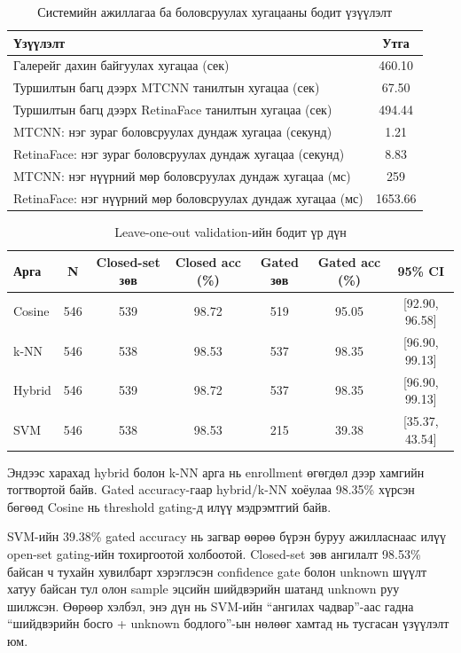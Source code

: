 \begin{table}[H]
	\centering
	\caption{Системийн ажиллагаа ба боловсруулах хугацааны бодит үзүүлэлт}
	\label{tab:attendance-operational-template}
	\begin{tabular}{|l|c|}
		\hline
		\textbf{Үзүүлэлт} & \textbf{Утга} \\
		\hline
		Галерейг дахин байгуулах хугацаа (сек) & 460.10 \\
		\hline
		Туршилтын багц дээрх MTCNN танилтын хугацаа (сек) & 67.50 \\
		\hline
		Туршилтын багц дээрх RetinaFace танилтын хугацаа (сек) & 494.44 \\
		\hline
		MTCNN: нэг зураг боловсруулах дундаж хугацаа (секунд) & 1.21 \\
		\hline
		RetinaFace: нэг зураг боловсруулах дундаж хугацаа (секунд) & 8.83 \\
		\hline
		MTCNN: нэг нүүрний мөр боловсруулах дундаж хугацаа (мс) & 259 \\
		\hline
		RetinaFace: нэг нүүрний мөр боловсруулах дундаж хугацаа (мс) & 1653.66 \\
		\hline
	\end{tabular}
\end{table}

\begin{table}[H]
	\centering
	\caption{Leave-one-out validation-ийн бодит үр дүн}
	\label{tab:method-confusion-metrics-template}
	\begin{tabular}{|l|c|c|c|c|c|c|}
		\hline
		\textbf{Арга} & \textbf{N} & \textbf{Closed-set зөв} & \textbf{Closed acc (\%)} & \textbf{Gated зөв} & \textbf{Gated acc (\%)} & \textbf{95\% CI} \\
		\hline
		Cosine & 546 & 539 & 98.72 & 519 & 95.05 & [92.90, 96.58] \\
		\hline
		k-NN & 546 & 538 & 98.53 & 537 & 98.35 & [96.90, 99.13] \\
		\hline
		Hybrid & 546 & 539 & 98.72 & 537 & 98.35 & [96.90, 99.13] \\
		\hline
		SVM & 546 & 538 & 98.53 & 215 & 39.38 & [35.37, 43.54] \\
		\hline
	\end{tabular}
\end{table}

Эндээс харахад hybrid болон k-NN арга нь enrollment өгөгдөл дээр хамгийн тогтвортой байв. Gated accuracy-гаар hybrid/k-NN хоёулаа 98.35\% хүрсэн бөгөөд Cosine нь threshold gating-д илүү мэдрэмтгий байв.

SVM-ийн 39.38\% gated accuracy нь загвар өөрөө бүрэн буруу ажилласнаас илүү open-set gating-ийн тохиргоотой холбоотой. Closed-set зөв ангилалт 98.53\% байсан ч тухайн хувилбарт хэрэглэсэн confidence gate болон unknown шүүлт хатуу байсан тул олон sample эцсийн шийдвэрийн шатанд unknown руу шилжсэн. Өөрөөр хэлбэл, энэ дүн нь SVM-ийн 
``ангилах чадвар''-аас гадна ``шийдвэрийн босго + unknown бодлого''-ын нөлөөг хамтад нь тусгасан үзүүлэлт юм.

